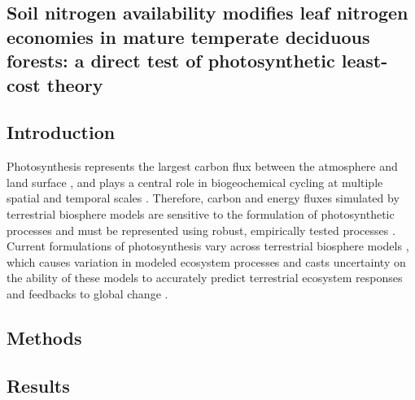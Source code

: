 \begin{singlespace}
    \chapter{\textbf{Soil nitrogen availability modifies leaf nitrogen economies in mature temperate deciduous forests: a direct test of photosynthetic least-cost theory}}
    \end{singlespace}
    
    \section{Introduction}

    Photosynthesis represents the largest carbon flux between the atmosphere and land surface , and plays a central role in biogeochemical cycling at multiple spatial and temporal scales . Therefore, carbon and energy fluxes simulated by terrestrial biosphere models are sensitive to the formulation of photosynthetic processes  and must be represented using robust, empirically tested processes . Current formulations of photosynthesis vary across terrestrial biosphere models , which causes variation in modeled ecosystem processes  and casts uncertainty on the ability of these models to accurately predict terrestrial ecosystem responses and feedbacks to global change .




    \section{Methods}
    
    \section{Results}